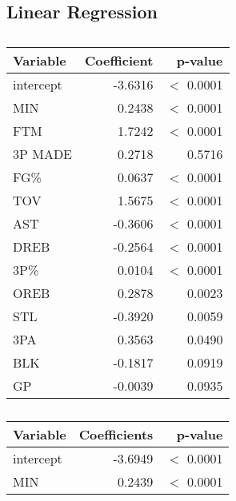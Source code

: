 \subsection*{Linear Regression}\label{appendix:lr}

\begin{center}
\end{center}

\begin{center}
\end{center}

\begin{table}[H]
	\begin{subtable}[h]{0.4\textwidth}
		\centering
		\begin{tabular}{|| l | r | r ||} 
			\hline
			Variable & Coefficient & p-value \\
			\hline
			intercept & -3.6316 & $<$ 0.0001 \\
			MIN & 0.2438 & $<$ 0.0001 \\
			FTM & 1.7242 & $<$ 0.0001 \\
			3P MADE & 0.2718 & 0.5716 \\
			FG\% & 0.0637 & $<$ 0.0001 \\
			TOV & 1.5675 & $<$ 0.0001 \\
			AST & -0.3606 & $<$ 0.0001 \\
			DREB & -0.2564 & $<$ 0.0001 \\
			3P\% & 0.0104 & $<$ 0.0001 \\
			OREB & 0.2878 & 0.0023 \\
			STL & -0.3920 & 0.0059 \\
			3PA & 0.3563 & 0.0490 \\
			BLK & -0.1817 & 0.0919 \\
			GP & -0.0039 & 0.0935 \\
			\hline
		\end{tabular}
		\caption{}
		\label{table:ForwardModelSummary}
	\end{subtable}
	\hfill
	\begin{subtable}[h]{0.4\textwidth}
		\centering
		\begin{tabular}{|| l | r | r ||} 
			\hline
			Variable & Coefficients & p-value \\
			\hline
			intercept & -3.6949 & $<$ 0.0001 \\
			MIN & 0.2439 & $<$ 0.0001 \\

\end{tabular}
\end{subtable}
\end{table}
